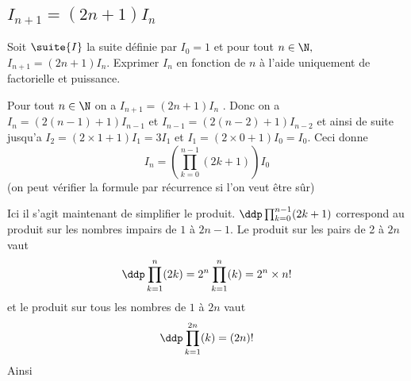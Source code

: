 \subsection{$I_{n+1} =(2n+1)I_n$}

\begin{exercice}
Soit $\suite{I}$ la suite définie par $I_0=1$ et pour tout $n\in \N,$ $I_{n+1} =(2n+1)I_n$.
Exprimer $I_n$ en fonction de $n$ à l'aide uniquement de factorielle et puissance. 
\end{exercice}



\begin{correction}
Pour tout $n\in \N$ on a $I_{n+1} = (2n+1)I_n$ . Donc on a 
$I_n =(2(n-1) +1) I_{n-1}$ et $I_{n-1} =(2(n-2) +1) I_{n-2}$ et ainsi de suite jusqu'a $I_2 =(2\times 1+1) I_1=3I_1$ et $I_1 =(2\times 0+1) I_0 =I_0$. 
Ceci donne 
$$I_{n} = \left(\prod_{k=0}^{n-1} (2k+1) \right)I_0$$
(on peut vérifier la formule par récurrence si l'on veut être sûr) 

Ici il s'agit maintenant de simplifier le produit. 
$\ddp \prod_{k=0}^{n-1} (2k+1) $ correspond au produit sur les nombres impairs de $1$ à $2n-1$. Le produit sur les pairs de 2 à $2n$  vaut 
$$\ddp  \prod_{k=1}^{n} (2k)  = 2^n   \prod_{k=1}^{n} (k)  = 2^n \times n! $$
et le produit sur tous les nombres de $1$ à $2n$ vaut 
$$\ddp  \prod_{k=1}^{2n} (k)  =   (2n)! $$
Ainsi 
\end{correction}
